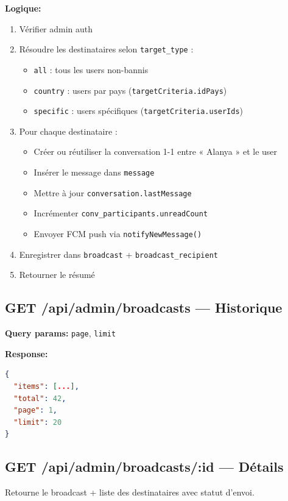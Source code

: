 \documentclass{article}
\begin{document}
\textbf{Logique:}
\begin{enumerate}
    \item Vérifier admin auth
    \item Résoudre les destinataires selon \texttt{target\_type} :
    \begin{itemize}
        \item \texttt{all} : tous les users non-bannis
        \item \texttt{country} : users par pays (\texttt{targetCriteria.idPays})
        \item \texttt{specific} : users spécifiques (\texttt{targetCriteria.userIds})
    \end{itemize}
    \item Pour chaque destinataire :
    \begin{itemize}
        \item Créer ou réutiliser la conversation 1-1 entre « Alanya » et le user
        \item Insérer le message dans \texttt{message}
        \item Mettre à jour \texttt{conversation.lastMessage}
        \item Incrémenter \texttt{conv\_participants.unreadCount}
        \item Envoyer FCM push via \texttt{notifyNewMessage()}
    \end{itemize}
    \item Enregistrer dans \texttt{broadcast} + \texttt{broadcast\_recipient}
    \item Retourner le résumé
\end{enumerate}

\subsection{GET /api/admin/broadcasts --- Historique}

\textbf{Query params:} \texttt{page}, \texttt{limit}

\textbf{Response:}
\begin{lstlisting}[language=JSON]
{
  "items": [...],
  "total": 42,
  "page": 1,
  "limit": 20
}
\end{lstlisting}

\subsection{GET /api/admin/broadcasts/:id --- Détails}

Retourne le broadcast + liste des destinataires avec statut d'envoi.
\end{document}
